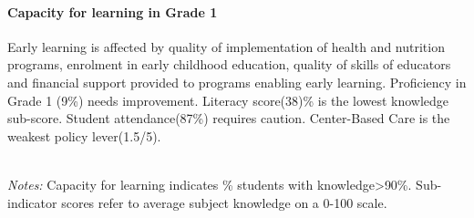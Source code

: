 \documentclass[
  twocolumn]{article}
\begin{document}
\hypertarget{capacity-for-learning-in-grade-1}{%
\paragraph{\texorpdfstring{\textbf{Capacity for learning in Grade
1}}{Capacity for learning in Grade 1}}\label{capacity-for-learning-in-grade-1}}

Early learning is affected by quality of implementation of health and
nutrition programs, enrolment in early childhood education, quality of
skills of educators and financial support provided to programs enabling
early learning. Proficiency in Grade 1 (9\%) needs improvement. Literacy
score(38)\% is the lowest knowledge sub-score. Student attendance(87\%)
requires caution. Center-Based Care is the weakest policy lever(1.5/5).

\begin{table}[H]
\\
\color{darkgray}\scriptsize{\textit{Notes:} Capacity for learning indicates \% students with knowledge\textgreater{90\%}. Sub-indicator scores refer to average subject knowledge on a 0-100 scale.}
\end{table}
\raggedbottom
\end{document}
